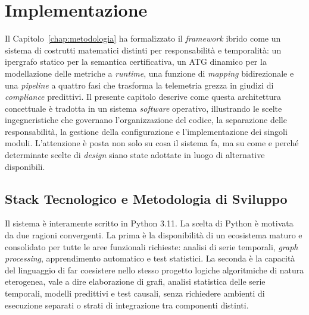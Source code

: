 
\chapter{Implementazione}
\label{chap:implementazione}

Il Capitolo~\ref{chap:metodologia} ha formalizzato il \textit{framework} ibrido come un sistema di
costrutti matematici distinti per responsabilità e temporalità: un ipergrafo statico per la
semantica certificativa, un \gls{ATG} dinamico per la modellazione delle metriche a
\textit{runtime}, una funzione di \textit{mapping} bidirezionale e una \textit{pipeline} a quattro
fasi che trasforma la telemetria grezza in giudizi di \textit{compliance} predittivi. Il presente
capitolo descrive come questa architettura concettuale è tradotta in un sistema \textit{software}
operativo, illustrando le scelte ingegneristiche che governano l'organizzazione del codice, la
separazione delle responsabilità, la gestione della configurazione e l'implementazione dei singoli
moduli. L'attenzione è posta non solo su cosa il sistema fa, ma su come e perché determinate scelte
di \textit{design} siano state adottate in luogo di alternative disponibili.

\section{Stack Tecnologico e Metodologia di Sviluppo}
\label{sec:stack_metodologia}

Il sistema è interamente scritto in Python 3.11. La scelta di Python è motivata da due ragioni
convergenti. La prima è la disponibilità di un ecosistema maturo e consolidato per tutte le
aree funzionali richieste: analisi di serie temporali, \textit{graph processing}, apprendimento
automatico e test statistici. La seconda è la capacità del linguaggio di far coesistere nello
stesso progetto logiche algoritmiche di natura eterogenea, vale a dire elaborazione di grafi, analisi
statistica delle serie temporali, modelli predittivi e test causali, senza richiedere
ambienti di esecuzione separati o strati di integrazione tra componenti distinti.

